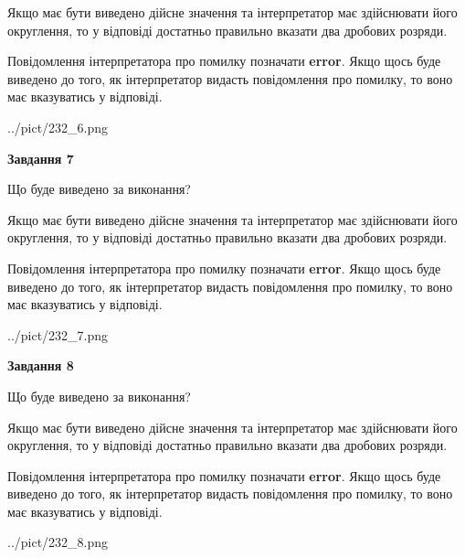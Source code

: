 \documentclass[12pt, ukrainian]{article}
\begin{document}
{\begin {Large}
Якщо має бути виведено дійсне значення та інтерпретатор має здійснювати його округлення, 
то у відповіді достатньо правильно вказати два дробових розряди.

Повідомлення інтерпретатора про помилку позначати \textbf{error}.
Якщо щось буде виведено до того, як інтерпретатор видасть повідомлення про помилку, 
то воно має вказуватись у відповіді. \par

\begin{center}
	{../pict/232_6.png}
\end{center}
\newpage

{\begin {center}\textbf{Завдання 7}\end {center}}\par
Що буде виведено за виконання? \par

Якщо має бути виведено дійсне значення та інтерпретатор має здійснювати його округлення, 
то у відповіді достатньо правильно вказати два дробових розряди.

Повідомлення інтерпретатора про помилку позначати \textbf{error}.
Якщо щось буде виведено до того, як інтерпретатор видасть повідомлення про помилку, 
то воно має вказуватись у відповіді. \par

\begin{center}
	{../pict/232_7.png}
\end{center}
\newpage

{\begin {center}\textbf{Завдання 8}\end {center}}\par
Що буде виведено за виконання? \par

Якщо має бути виведено дійсне значення та інтерпретатор має здійснювати його округлення, 
то у відповіді достатньо правильно вказати два дробових розряди.

Повідомлення інтерпретатора про помилку позначати \textbf{error}.
Якщо щось буде виведено до того, як інтерпретатор видасть повідомлення про помилку, 
то воно має вказуватись у відповіді. \par

\begin{center}
	{../pict/232_8.png}
\end{center}
\newpage


\end{Large}}
\end{document}
